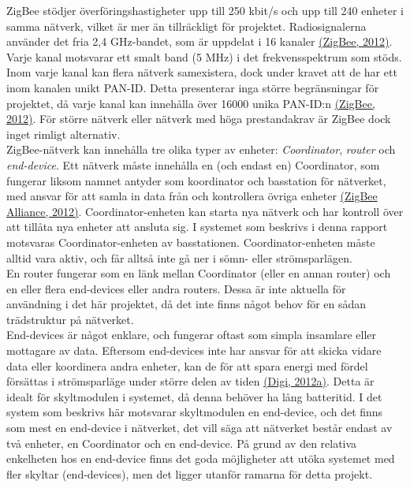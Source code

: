 \documentclass[a4paper,11pt]{article}
\begin{document}
ZigBee stödjer överföringshastigheter upp till 250 kbit/s och upp till 240 enheter i samma nätverk, vilket är mer än tillräckligt för projektet. Radiosignalerna använder det fria 2,4 GHz-bandet, som är uppdelat i 16 kanaler \hyperref[zigbee]{(ZigBee, 2012)}. Varje kanal motsvarar ett smalt band (5 MHz) i det frekvensspektrum som stöds. Inom varje kanal kan flera nätverk samexistera, dock under kravet att de har ett inom kanalen unikt PAN-ID. Detta presenterar inga större begränsningar för projektet, då varje kanal kan innehålla över 16000 unika PAN-ID:n \hyperref[zigbee]{(ZigBee, 2012)}. För större nätverk eller nätverk med höga prestandakrav är ZigBee dock inget rimligt alternativ. \\

ZigBee-nätverk kan innehålla tre olika typer av enheter: {\it Coordinator}, {\it router} och {\it end-device}. Ett nätverk måste innehålla en (och endast en) Coordinator, som fungerar liksom namnet antyder som koordinator och basstation för nätverket, med ansvar för att samla in data från och kontrollera övriga enheter \hyperref[zigbee]{(ZigBee Alliance, 2012)}. Coordinator-enheten kan starta nya nätverk och har kontroll över att tillåta nya enheter att ansluta sig. I systemet som beskrivs i denna rapport motsvaras Coordinator-enheten av basstationen. Coordinator-enheten måste alltid vara aktiv, och får alltså inte gå ner i sömn- eller strömsparlägen. \\

En router fungerar som en länk mellan Coordinator (eller en annan router) och en eller flera end-devices eller andra routers. Dessa är inte aktuella för användning i det här projektet, då det inte finns något behov för en sådan trädstruktur på nätverket. \\

End-devices är något enklare, och fungerar oftast som simpla insamlare eller mottagare av data. Eftersom end-devices inte har ansvar för att skicka vidare data eller koordinera andra enheter, kan de för att spara energi med fördel försättas i strömsparläge under större delen av tiden \hyperref[digi]{(Digi, 2012a)}. Detta är idealt för skyltmodulen i systemet, då denna behöver ha lång batteritid. I det system som beskrivs här motsvarar skyltmodulen en end-device, och det finns som mest en end-device i nätverket, det vill säga att nätverket består endast av två enheter, en Coordinator och en end-device. På grund av den relativa enkelheten hos en end-device finns det goda möjligheter att utöka systemet med fler skyltar (end-devices), men det ligger utanför ramarna för detta projekt.
\end{document}
